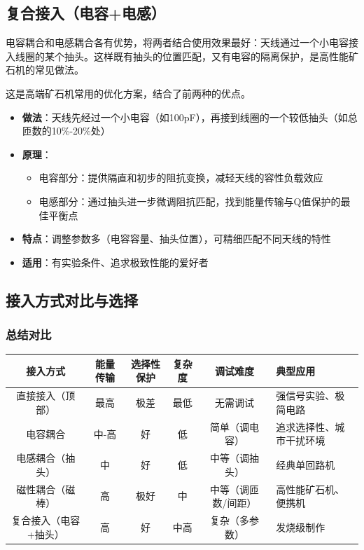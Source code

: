 \documentclass[12pt,UTF8]{ctexbook}
\begin{document}
\subsection{复合接入（电容+电感）}

电容耦合和电感耦合各有优势，将两者结合使用效果最好：天线通过一个小电容接入线圈的某个抽头。这样既有抽头的位置匹配，又有电容的隔离保护，是高性能矿石机的常见做法。

这是高端矿石机常用的优化方案，结合了前两种的优点。

\begin{itemize}[leftmargin=3.5em]
	\item \textbf{做法}：天线先经过一个小电容（如100pF），再接到线圈的一个较低抽头（如总匝数的10\%-20\%处）
	\item \textbf{原理}：
	\begin{itemize}[leftmargin=3.5em]
		\item 电容部分：提供隔直和初步的阻抗变换，减轻天线的容性负载效应
		\item 电感部分：通过抽头进一步微调阻抗匹配，找到能量传输与Q值保护的最佳平衡点
	\end{itemize}
	\item \textbf{特点}：调整参数多（电容容量、抽头位置），可精细匹配不同天线的特性
	\item \textbf{适用}：有实验条件、追求极致性能的爱好者
\end{itemize}

\subsection{接入方式对比与选择}

\subsubsection{总结对比}

\begin{table}[htbp]
	\centering
	\begin{tabular}{|c|c|c|c|c|p{4cm}|}
		\hline
		接入方式 & 能量传输 & 选择性保护 & 复杂度 & 调试难度 & 典型应用 \\
		\hline
		直接接入（顶部） & 最高 & 极差 & 最低 & 无需调试 & 强信号实验、极简电路 \\
		\hline
		电容耦合 & 中-高 & 好 & 低 & 简单（调电容） & 追求选择性、城市干扰环境 \\
		\hline
		电感耦合（抽头） & 中 & 好 & 低 & 中等（调抽头） & 经典单回路机 \\
		\hline
		磁性耦合（磁棒） & 高 & 极好 & 中 & 中等（调匝数/间距） & 高性能矿石机、便携机 \\
		\hline
		复合接入（电容+抽头） & 高 & 好 & 中高 & 复杂（多参数） & 发烧级制作 \\
		\hline
	\end{tabular}
\end{table}
\end{document}
